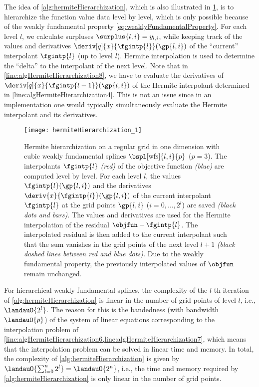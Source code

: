 \vspace*{\fill}

The idea of \cref{alg:hermiteHierarchization},
which is also illustrated in \cref{fig:hermiteHierarchization},
is to hierarchize the function value data level by level,
which is only possible because of the weakly fundamental property
\eqref{eq:weaklyFundamentalProperty}.
For each level $l$, we calculate surpluses
$\surplus{l,i} = \linout{l,i}$, while keeping track of
the values and derivatives
$\deriv[q]{x}{\fgintp{l}}(\gp{l,i})$ of the
``current'' interpolant $\fgintp{l}$ (up to level $l$).
Hermite interpolation is used to determine the ``delta''
to the interpolant of the next level.
Note that in \cref{line:algHermiteHierarchization8},
we have to evaluate the derivatives of
$\deriv[q]{x}{\fgintp{l-1}}(\gp{l,i})$ of the Hermite interpolant
determined in \cref{line:algHermiteHierarchization4}.
This is not an issue since in an implementation
one would typically simultaneously evaluate the
Hermite interpolant and its derivatives.

\vspace*{\fill}

\begin{SCfigure}
  \texttt{[image: hermiteHierarchization\_1]}%
  \caption[%
    Hermite hierarchization%
  ]{%
    Hermite hierarchization on a regular grid in one dimension
    with cubic weakly fundamental splines $\bspl[\wfs]{l,i}{p}$ ($p = 3$).
    The interpolants $\fgintp{l}$ \emph{\textcolor{C1}{(red)}}
    of the objective function \emph{\textcolor{C0}{(blue)}}
    are computed level by level.
    For each level $l$,
    \vspace{-0.1em}%
    the values $\fgintp{l}(\gp{l,i})$ and the derivatives
    $\deriv{x}{\fgintp{l}}(\gp{l,i})$ of the
    current interpolant $\fgintp{l}$ at the
    grid points $\gp{l,i}$ ($i = 0, \dotsc, 2^l$) are saved
    \emph{(black dots and bars).}
    The values and derivatives are used for the Hermite interpolation
    of the residual $\objfun - \fgintp{l}$.
    The interpolated residual is then added to the current interpolant
    such that the sum vanishes in the grid points of the next level $l + 1$
    \emph{%
      (black dashed lines between \textcolor{C1}{red} and
      \textcolor{C0}{blue} dots).%
    }
    Due to the weakly fundamental property, the previously
    interpolated values of $\objfun$ remain unchanged.%
  }%
  \label{fig:hermiteHierarchization}%
\end{SCfigure}

For hierarchical weakly fundamental splines,
the complexity of the $l$-th iteration of \cref{alg:hermiteHierarchization}
is linear in the number of grid points of level $l$, i.e., $\landauO{2^l}$.
The reason for this is the bandedness (with bandwidth $\landauO{p}$) of the
system of linear equations corresponding to the interpolation problem of
\cref{line:algHermiteHierarchization6,line:algHermiteHierarchization7},
which means that the interpolation problem can be solved in
linear time and memory.
In total, the complexity of \cref{alg:hermiteHierarchization} is
given by $\landauO{\sum_{l=0}^n 2^l} = \landauO{2^n}$, i.e.,
the time and memory required by \cref{alg:hermiteHierarchization}
is only linear in the number of grid points.

